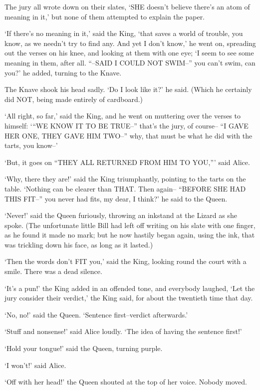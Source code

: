 \documentclass[12pt]{book}
\begin{document}
  The jury all wrote down on their slates, `SHE doesn't believe
there's an atom of meaning in it,' but none of them attempted to
explain the paper.

  `If there's no meaning in it,' said the King, `that saves a
world of trouble, you know, as we needn't try to find any.  And
yet I don't know,' he went on, spreading out the verses on his
knee, and looking at them with one eye; `I seem to see some
meaning in them, after all.  ``--SAID I COULD NOT SWIM--'' you
can't swim, can you?' he added, turning to the Knave.

  The Knave shook his head sadly.  `Do I look like it?' he said.
(Which he certainly did NOT, being made entirely of cardboard.)

  `All right, so far,' said the King, and he went on muttering
over the verses to himself:  `{}``WE KNOW IT TO BE TRUE--'' that's
the jury, of course-- ``I GAVE HER ONE, THEY GAVE HIM TWO--'' why,
that must be what he did with the tarts, you know--'

  `But, it goes on ``THEY ALL RETURNED FROM HIM TO YOU,''' said
Alice.

  `Why, there they are!' said the King triumphantly, pointing to
the tarts on the table.  `Nothing can be clearer than THAT.
Then again-- ``BEFORE SHE HAD THIS FIT--''  you never had fits, my
dear, I think?' he said to the Queen.

  `Never!' said the Queen furiously, throwing an inkstand at the
Lizard as she spoke.  (The unfortunate little Bill had left off
writing on his slate with one finger, as he found it made no
mark; but he now hastily began again, using the ink, that was
trickling down his face, as long as it lasted.)

  `Then the words don't FIT you,' said the King, looking round
the court with a smile.  There was a dead silence.

  `It's a pun!' the King added in an offended tone, and
everybody laughed, `Let the jury consider their verdict,' the
King said, for about the twentieth time that day.

  `No, no!' said the Queen.  `Sentence first--verdict afterwards.'

  `Stuff and nonsense!' said Alice loudly.  `The idea of having
the sentence first!'

  `Hold your tongue!' said the Queen, turning purple.

  `I won't!' said Alice.

  `Off with her head!' the Queen shouted at the top of her voice.
Nobody moved.
\end{document}
